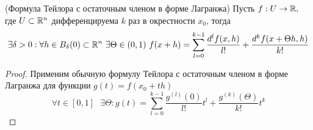 \begin{theorem}
	(Формула Тейлора с остаточным членом в форме Лагранжа) Пусть $f : U \to \mathbb{R},$ где $U \subset \mathbb{R}^n$ дифференцируема $k$ раз в окрестности $x_0$, тогда 
	\[ \exists \delta > 0 : \forall h \in B_{\delta}(0) \subset \mathbb{R}^n \text{ } \exists \Theta \in (0, 1) \text{ } f(x + h) = \sum^{k - 1}_{l = 0} \frac{d^lf(x, h)}{l!} + \frac{d^kf(x + \Theta h, h)}{k!} \]
	\begin{proof}
		Применим обычную формулу Тейлора с остаточным членом в форме Лагранжа для функции $g(t) = f(x_0 + th)$
		\[ \forall t \in [0, 1] \text{ } \exists \Theta : g(t) = \sum^{k - 1}_{l = 0}\frac{g^{(l)}(0)}{l!}t^l + \frac{g^{(k)}(\Theta)}{k!}t^{k} \]
	\end{proof}
\end{theorem}































